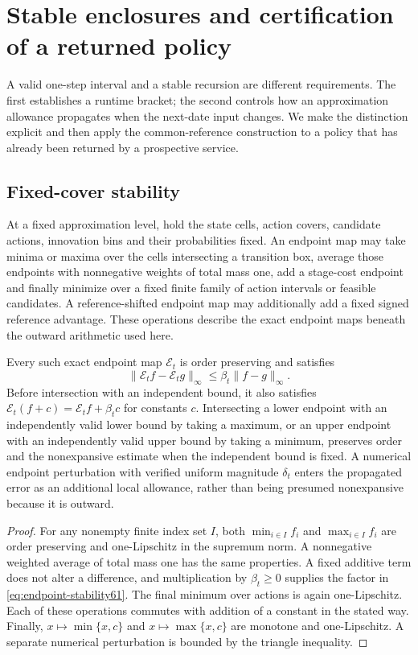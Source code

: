 \section{Stable enclosures and certification of a returned policy}\label{sec:stability61}
A valid one-step interval and a stable recursion are different requirements. The first establishes a runtime bracket; the second controls how an approximation allowance propagates when the next-date input changes. We make the distinction explicit and then apply the common-reference construction to a policy that has already been returned by a prospective service.

\subsection{Fixed-cover stability}
At a fixed approximation level, hold the state cells, action covers, candidate actions, innovation bins and their probabilities fixed. An endpoint map may take minima or maxima over the cells intersecting a transition box, average those endpoints with nonnegative weights of total mass one, add a stage-cost endpoint and finally minimize over a fixed finite family of action intervals or feasible candidates. A reference-shifted endpoint map may additionally add a fixed signed reference advantage. These operations describe the exact endpoint maps beneath the outward arithmetic used here.

\begin{lemma}\label{lem:stable61}
Every such exact endpoint map $\mathcal E_t$ is order preserving and satisfies
\begin{equation}\label{eq:endpoint-stability61}
 \|\mathcal E_t f-\mathcal E_t g\|_\infty
       \le\beta_t\|f-g\|_\infty.
\end{equation}
Before intersection with an independent bound, it also satisfies
$\mathcal E_t(f+c)=\mathcal E_t f+\beta_t c$ for constants $c$. Intersecting a lower endpoint with an independently valid lower bound by taking a maximum, or an upper endpoint with an independently valid upper bound by taking a minimum, preserves order and the nonexpansive estimate when the independent bound is fixed. A numerical endpoint perturbation with verified uniform magnitude $\delta_t$ enters the propagated error as an additional local allowance, rather than being presumed nonexpansive because it is outward.
\end{lemma}
\begin{proof}
For any nonempty finite index set $I$, both $\min_{i\in I}f_i$ and $\max_{i\in I}f_i$ are order preserving and one-Lipschitz in the supremum norm. A nonnegative weighted average of total mass one has the same properties. A fixed additive term does not alter a difference, and multiplication by $\beta_t\ge0$ supplies the factor in \eqref{eq:endpoint-stability61}. The final minimum over actions is again one-Lipschitz. Each of these operations commutes with addition of a constant in the stated way. Finally, $x\mapsto\min\{x,c\}$ and $x\mapsto\max\{x,c\}$ are monotone and one-Lipschitz. A separate numerical perturbation is bounded by the triangle inequality.
\end{proof}

